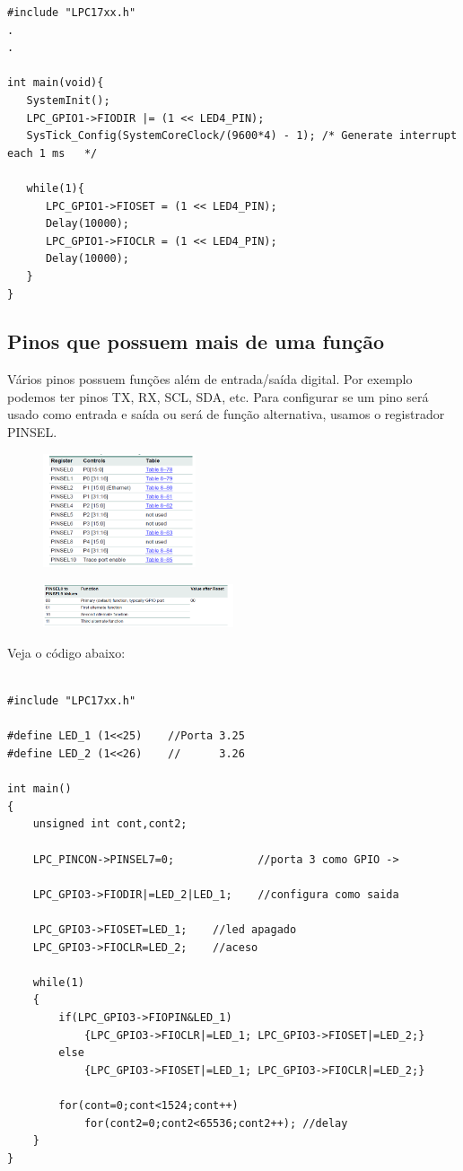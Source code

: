 \documentclass[a4paper,10pt]{article}
\begin{document}
\begin{lstlisting}
#include "LPC17xx.h"
.
.

int main(void){
   SystemInit();
   LPC_GPIO1->FIODIR |= (1 << LED4_PIN);
   SysTick_Config(SystemCoreClock/(9600*4) - 1); /* Generate interrupt each 1 ms   */ 
 
   while(1){            
      LPC_GPIO1->FIOSET = (1 << LED4_PIN);
      Delay(10000);
      LPC_GPIO1->FIOCLR = (1 << LED4_PIN);
      Delay(10000);
   }
}
\end{lstlisting}

\subsection{Pinos que possuem mais de uma função}

Vários pinos possuem funções além de entrada/saída digital. Por exemplo podemos ter pinos TX, RX, SCL, SDA, etc. Para configurar se um pino será usado como 
entrada e saída ou será de função alternativa,  usamos o registrador PINSEL.

\begin{figure}[!htb]
 \centering\includegraphics[width=0.4\textwidth]{pinsel_1}
\end{figure}
\begin{figure}[!htb]
 \centering\includegraphics[width=0.5\textwidth]{pinsel_2}
\end{figure}


Veja o código abaixo:


\begin{lstlisting}

#include "LPC17xx.h"

#define LED_1 (1<<25)    //Porta 3.25
#define LED_2 (1<<26)    //      3.26

int main()
{    
    unsigned int cont,cont2;
    
    LPC_PINCON->PINSEL7=0;             //porta 3 como GPIO ->  
                                       
    LPC_GPIO3->FIODIR|=LED_2|LED_1;    //configura como saida
    
    LPC_GPIO3->FIOSET=LED_1;    //led apagado
    LPC_GPIO3->FIOCLR=LED_2;    //aceso
    
    while(1)
    {        
        if(LPC_GPIO3->FIOPIN&LED_1)
            {LPC_GPIO3->FIOCLR|=LED_1; LPC_GPIO3->FIOSET|=LED_2;}
        else
            {LPC_GPIO3->FIOSET|=LED_1; LPC_GPIO3->FIOCLR|=LED_2;}
        
        for(cont=0;cont<1524;cont++)
            for(cont2=0;cont2<65536;cont2++); //delay
    }
}
\end{lstlisting}
\end{document}
